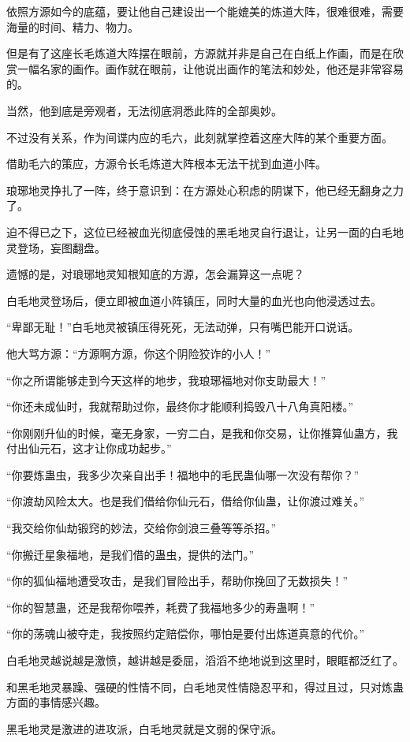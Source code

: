 \begin{this_body}
依照方源如今的底蕴，要让他自己建设出一个能媲美的炼道大阵，很难很难，需要海量的时间、精力、物力。

但是有了这座长毛炼道大阵摆在眼前，方源就并非是自己在白纸上作画，而是在欣赏一幅名家的画作。画作就在眼前，让他说出画作的笔法和妙处，他还是非常容易的。

当然，他到底是旁观者，无法彻底洞悉此阵的全部奥妙。

不过没有关系，作为间谍内应的毛六，此刻就掌控着这座大阵的某个重要方面。

借助毛六的策应，方源令长毛炼道大阵根本无法干扰到血道小阵。

琅琊地灵挣扎了一阵，终于意识到：在方源处心积虑的阴谋下，他已经无翻身之力了。

迫不得已之下，这位已经被血光彻底侵蚀的黑毛地灵自行退让，让另一面的白毛地灵登场，妄图翻盘。

遗憾的是，对琅琊地灵知根知底的方源，怎会漏算这一点呢？

白毛地灵登场后，便立即被血道小阵镇压，同时大量的血光也向他浸透过去。

“卑鄙无耻！”白毛地灵被镇压得死死，无法动弹，只有嘴巴能开口说话。

他大骂方源：“方源啊方源，你这个阴险狡诈的小人！”

“你之所谓能够走到今天这样的地步，我琅琊福地对你支助最大！”

“你还未成仙时，我就帮助过你，最终你才能顺利捣毁八十八角真阳楼。”

“你刚刚升仙的时候，毫无身家，一穷二白，是我和你交易，让你推算仙蛊方，我付出仙元石，这才让你成功起步。”

“你要炼蛊虫，我多少次亲自出手！福地中的毛民蛊仙哪一次没有帮你？”

“你渡劫风险太大。也是我们借给你仙元石，借给你仙蛊，让你渡过难关。”

“我交给你仙劫锻窍的妙法，交给你剑浪三叠等等杀招。”

“你搬迁星象福地，是我们借的蛊虫，提供的法门。”

“你的狐仙福地遭受攻击，是我们冒险出手，帮助你挽回了无数损失！”

“你的智慧蛊，还是我帮你喂养，耗费了我福地多少的寿蛊啊！”

“你的荡魂山被夺走，我按照约定赔偿你，哪怕是要付出炼道真意的代价。”

白毛地灵越说越是激愤，越讲越是委屈，滔滔不绝地说到这里时，眼眶都泛红了。

和黑毛地灵暴躁、强硬的性情不同，白毛地灵性情隐忍平和，得过且过，只对炼蛊方面的事情感兴趣。

黑毛地灵是激进的进攻派，白毛地灵就是文弱的保守派。


\end{this_body}
